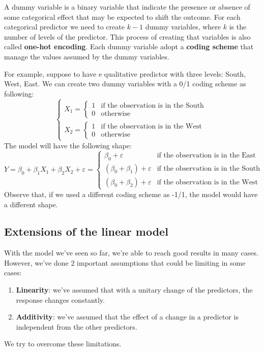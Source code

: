 A dummy variable is a binary variable that indicate the presence or absence of some categorical effect that may be expected to shift the outcome. For each categorical predictor we need to create $k-1$ dummy variables, where $k$ is the number of levels of the predictor. This process of creating that variables is also called \textbf{one-hot encoding}.
Each dummy variable adopt a \textbf{coding scheme} that manage the values assumed by the dummy variables. 

For example, suppose to have e qualitative predictor with three levels: South, West, East. We can create two dummy variables with a 0/1 coding scheme as following:
\[
    \begin{cases}
        X_1 =  
        \begin{cases}
            1 & \text{if the observation is in the South} \\
            0 & \text{otherwise}
        \end{cases}\\
        X_2 = 
        \begin{cases}
            1 & \text{if the observation is in the West} \\
            0 & \text{otherwise}
        \end{cases}
    \end{cases}
\]
The model will have the following shape:
\[
    Y = \beta_0 + \beta_1 X_1 + \beta_2 X_2 + \varepsilon  = 
    \begin{cases}
        \beta_0 + \varepsilon & \text{if the observation is in the East} \\
        (\beta_0 + \beta_1) + \varepsilon & \text{if the observation is in the South} \\
        (\beta_0 + \beta_2) + \varepsilon & \text{if the observation is in the West}
    \end{cases}
\]
Observe that, if we used a different coding scheme as -1/1, the model would have a different shape.
\subsection*{Extensions of the linear model}
With the model we've seen so far, we're able to reach good results in many cases. However, we've done 2 important assumptions that could be limiting in some cases:
\begin{enumerate}
    \item \textbf{Linearity}: we've assumed that with a unitary change of the predictors, the response changes constantly. 
    \item \textbf{Additivity}: we've assumed that the effect of a change in a predictor is independent from the other predictors.
\end{enumerate}
We try to overcome these limitations.
